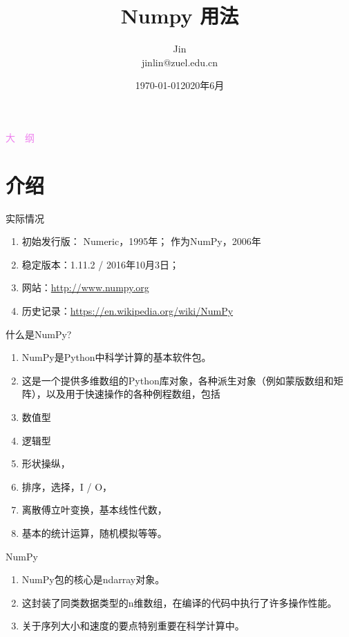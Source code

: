 \documentclass[ignorenonframetext,11pt,xcolor=dvipsnames,hyperref={colorlinks,allcolors=.,urlcolor=blue, citecolor=violet, bookmarksdepth=4},aspectratio=1610]{beamer}
\author[Jin]{\CJKfamily{kai}Jin \\ jinlin@zuel.edu.cn \\}
\institute[中南财经政法大学统计与数学学院]{\normalsize\CJKfamily{kai}中南财经政法大学统计与数学学院}
\date{\today}
\date{2020年6月}
\title{Numpy 用法}
\providecommand{\tightlist}{%
  \setlength{\itemsep}{0pt}\setlength{\parskip}{0pt}}
\begin{document}
\frame{\titlepage}

\begin{frame}{\textcolor{violet}{\normalfont\Large {}大\ \ 纲 }} \textcolor{violet}{}
\tableofcontents[hideallsubsections]
\end{frame}

\hypertarget{section}{%
\section{介绍}\label{section}}

\begin{frame}{实际情况}
\protect\hypertarget{section-1}{}

\begin{enumerate}
\tightlist
\item
  初始发行版： Numeric，1995年； 作为NumPy，2006年
\item
  稳定版本：1.11.2 / 2016年10月3日；
\item
  网站：\url{http://www.numpy.org}
\item
  历史记录：\url{https://en.wikipedia.org/wiki/NumPy}
\end{enumerate}

\end{frame}

\begin{frame}{什么是NumPy?}
\protect\hypertarget{numpy}{}

\begin{enumerate}
\item
  NumPy是Python中科学计算的基本软件包。
\item
  这是一个提供多维数组的Python库对象，各种派生对象（例如蒙版数组和矩阵），以及用于快速操作的各种例程数组，包括
\item
  数值型
\item
  逻辑型
\item
  形状操纵，
\item
  排序，选择，I / O，
\item
  离散傅立叶变换，基本线性代数，
\item
  基本的统计运算，随机模拟等等。
\end{enumerate}

\end{frame}

\begin{frame}{NumPy}
\protect\hypertarget{numpy-1}{}

\begin{enumerate}
\tightlist
\item
  NumPy包的核心是ndarray对象。
\item
  这封装了同类数据类型的n维数组，在编译的代码中执行了许多操作性能。
\item
  关于序列大小和速度的要点特别重要在科学计算中。
\end{enumerate}

\end{frame}
\end{document}

